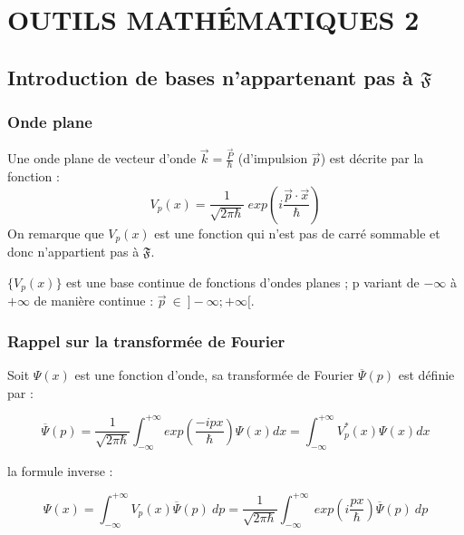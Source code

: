 \documentclass[12pt,a4paper,titlepage]{book}
\begin{document}
\chapter{OUTILS MATHÉMATIQUES 2}

\section{Introduction de bases n'appartenant pas à $\mathfrak{F}$}

\subsection{Onde plane}

Une onde plane de vecteur d'onde $\overrightarrow{k} = \frac{\overrightarrow{P}}{\hbar}$ (d'impulsion $\overrightarrow{p}$) est décrite par la fonction :
\begin{equation*}
V_p (x) = \frac{1}{\sqrt{2 \pi \hbar}} ~exp \left( i \frac{\overrightarrow{p} \cdot \overrightarrow{x}}{\hbar} \right)
\end{equation*}
On remarque que $V_p (x)$ est une fonction qui n'est pas de carré sommable et donc n'appartient pas à $\mathfrak{F}$.

$\lbrace V_p (x) \rbrace$ est une base continue de fonctions d'ondes planes ; p variant de $- \infty$ à $+ \infty$ de manière continue : $\overrightarrow{p} ~\in~ ]-\infty ; + \infty[$.

\subsection{Rappel sur la transformée de Fourier}

Soit $\Psi (x)$ est une fonction d'onde, sa transformée de Fourier $\overline{\Psi} (p)$ est définie par :

\begin{equation*}
\overline{\Psi} (p) = \frac{1}{\sqrt{2 \pi \hbar}} \int_{- \infty}^{+ \infty} exp \left( \frac{-i px}{\hbar} \right) \Psi (x) dx = \int_{- \infty}^{+ \infty} V_p^{*} (x) \Psi (x) dx 
\end{equation*}

la formule inverse :

\begin{equation*}
\Psi (x) = \int_{-\infty}^{+\infty} V_p (x) \overline{\Psi} (p) ~dp = \frac{1}{\sqrt{2 \pi \hbar}} \int_{-\infty}^{+\infty} ~exp \left( i \frac{px}{\hbar} \right) \overline{\Psi}(p) ~dp
\end{equation*}
\end{document}
